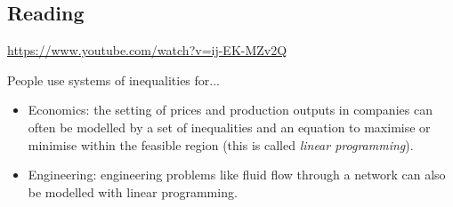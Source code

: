 



\subsection*{Reading}
\begin{center}
\begin{tcolorbox}[width=0.8\textwidth,colback={white},title={\textbf{Go and watch...}},colbacktitle=black,coltitle=white]
  \textcolor{black}{\url{https://www.youtube.com/watch?v=ij-EK-MZv2Q}}
\end{tcolorbox}
\end{center}

\begin{center}
\begin{tcolorbox}[width=0.8\textwidth,colback={white},title={\textbf{What's it good for?}},colbacktitle=MidnightBlue,coltitle=white]
  People use systems of inequalities for...
  \begin{itemize}
    \item Economics: the setting of prices and production outputs in companies can often be modelled by a set of inequalities and an
          equation to maximise or minimise within the feasible region (this is called \textit{linear programming}).
    \item Engineering: engineering problems like fluid flow through a network can also be modelled with linear programming.
  \end{itemize}
\end{tcolorbox}
\end{center}

